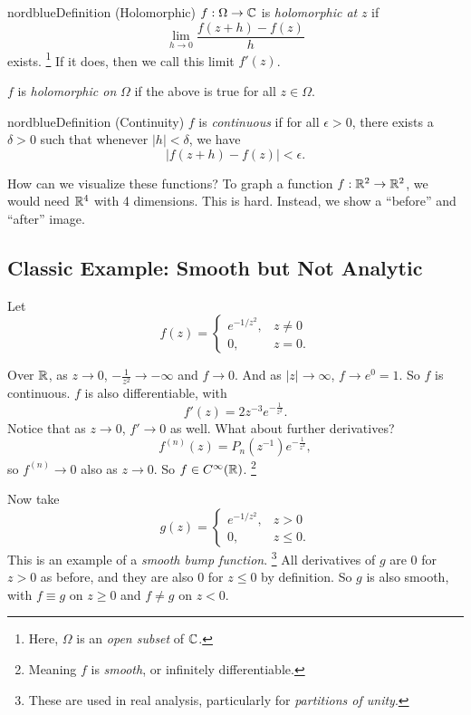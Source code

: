 \begin{mybox}{nordblue}{Definition (Holomorphic)}
  $f : \Omega \to \mathbb{C}$ is \textit{holomorphic at} $z$ if
  \[
    \lim_{h \to 0} \frac{f(z + h) - f(z)}{h}
  \]
  exists.
  \footnote{Here, $\Omega$ is an \textit{open subset} of
    $\mathbb{C}$.}
  If it does, then we call this limit $f'(z)$.

  $f$ is \textit{holomorphic on}
  $\Omega$ if the above is true for all $z \in \Omega$.
\end{mybox}

\begin{mybox}{nordblue}{Definition (Continuity)}
  $f$ is \textit{continuous} if for all $\epsilon > 0$,
  there exists a $\delta > 0$ such that whenever
  $|h|  < \delta$, we have
  \[
  |f(z + h) - f(z)| < \epsilon
  .\] 
\end{mybox}

How can we visualize these functions?
To graph a function $f : \mathbb{R}^2 \to \mathbb{R}^2$, we would need
$\mathbb{R}^4$ with 4 dimensions. This is hard. Instead,
we show a ``before'' and ``after'' image.


\subsection{Classic Example: Smooth but Not Analytic}
Let
\[
f(z) =
\begin{cases}
  e^{-1 / z^2}, & z \neq 0 \\
  0, & z = 0.
\end{cases}
\] 

Over $\mathbb{R}$, as $z \to 0$, $-\frac{1}{z^2} \to -\infty$
and $f \to 0$.  And as $|z| \to \infty$, $f \to e^0 = 1$. 
So $f$ is continuous. $f$ is also differentiable,
with
\[f'(z) = 2z^{-3}e^{-\frac{1}{z^2}}.\]
Notice that as $z \to 0$, $f' \to 0$ as well. What
about further derivatives?
\[
  f^{(n)}(z) = P_n(z^{-1})e^{-\frac{1}{z^2}}
,\] 
so $f^{(n)} \to 0$ also as $z \to 0$. So
$f \in C^\infty(\mathbb{R})$.
\footnote{Meaning $f$ is \textit{smooth}, or infinitely
differentiable.}

Now take
\[
g(z) =
\begin{cases}
  e^{-1 / z^2}, & z > 0 \\
  0, & z \le 0.
\end{cases}
\]
This is an example of a \textit{smooth bump function}.
\footnote{These are used in real analysis, particularly
for \textit{partitions of unity}.}
All derivatives of $g$ are $0$ for $z > 0$ as before,
and they are also $0$ for $z \le 0$ by definition. So
$g$ is also smooth, with $f \equiv g$ on $z \ge 0$ and
$f \ne g$ on $z < 0$.


